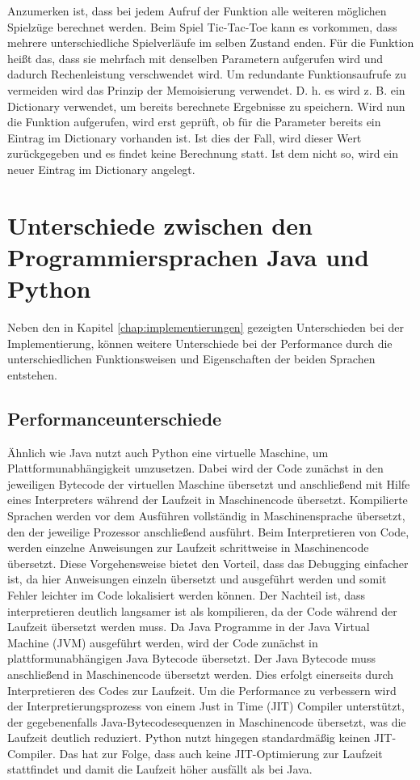 Anzumerken ist, dass bei jedem Aufruf der Funktion  alle weiteren möglichen Spielzüge berechnet werden. 
Beim Spiel Tic-Tac-Toe kann es vorkommen, dass mehrere unterschiedliche Spielverläufe im selben Zustand enden. 
Für die Funktion  heißt das, dass sie mehrfach mit denselben Parametern aufgerufen wird und dadurch 
Rechenleistung verschwendet wird. Um redundante Funktionsaufrufe zu vermeiden wird das Prinzip der Memoisierung 
verwendet. D. h. es wird z. B. ein Dictionary verwendet, um bereits berechnete Ergebnisse zu speichern. Wird nun 
die Funktion  aufgerufen, wird erst geprüft, ob für die Parameter bereits ein Eintrag im Dictionary 
vorhanden ist. Ist dies der Fall, wird dieser Wert zurückgegeben und es findet keine Berechnung statt. Ist dem nicht 
so, wird ein neuer Eintrag im Dictionary angelegt.

\section{Unterschiede zwischen den Programmiersprachen Java und Python}
\label{chap:unterschiede_python_java}
Neben den in Kapitel \ref{chap:implementierungen} gezeigten Unterschieden bei der Implementierung, können weitere Unterschiede 
bei der Performance durch die unterschiedlichen Funktionsweisen und Eigenschaften der beiden Sprachen entstehen.

\subsection{Performanceunterschiede}
Ähnlich wie Java nutzt auch Python eine virtuelle Maschine, um Plattformunabhängigkeit umzusetzen. Dabei wird der Code 
zunächst in den jeweiligen Bytecode der virtuellen Maschine übersetzt und anschließend mit Hilfe eines Interpreters während 
der Laufzeit in Maschinencode übersetzt. Kompilierte Sprachen werden vor dem Ausführen vollständig in Maschinensprache übersetzt, den der 
jeweilige Prozessor anschließend ausführt. Beim Interpretieren von Code, werden einzelne Anweisungen zur Laufzeit schrittweise 
in Maschinencode übersetzt. Diese Vorgehensweise bietet den Vorteil, dass das Debugging einfacher ist, da hier Anweisungen 
einzeln übersetzt und ausgeführt werden und somit Fehler leichter im Code lokalisiert werden können. Der Nachteil ist, dass 
interpretieren deutlich langsamer ist als kompilieren, da der Code während der Laufzeit übersetzt werden muss. Da Java Programme 
in der Java Virtual Machine (JVM) ausgeführt werden, wird der Code zunächst in plattformunabhängigen Java Bytecode übersetzt. 
Der Java Bytecode muss anschließend in Maschinencode übersetzt werden. Dies erfolgt einerseits durch Interpretieren des Codes 
zur Laufzeit. Um die Performance zu verbessern wird der Interpretierungsprozess von einem Just in Time (JIT) Compiler unterstützt, 
der gegebenenfalls Java-Bytecodesequenzen in Maschinencode übersetzt, was die Laufzeit deutlich reduziert.\autocite[Vgl.][]{Aboullaite.31.8.2017}
Python nutzt hingegen standardmäßig keinen JIT-Compiler. Das hat zur Folge, dass auch keine JIT-Optimierung zur Laufzeit stattfindet 
und damit die Laufzeit höher ausfällt als bei Java.\autocite[Vgl.][]{Shaw.16.7.2018}

